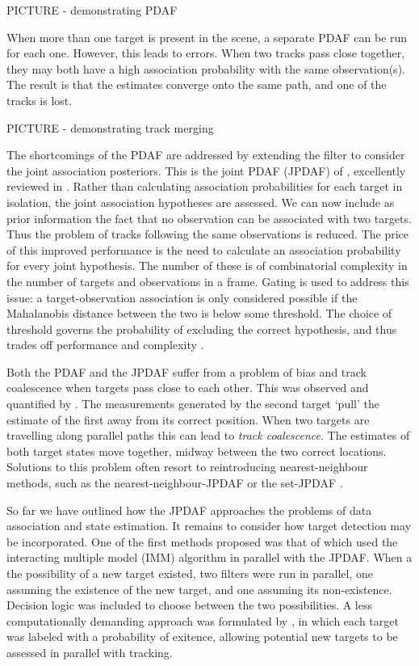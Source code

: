 PICTURE - demonstrating PDAF

When more than one target is present in the scene, a separate PDAF can be run for each one. However, this leads to errors. When two tracks pass close together, they may both have a high association probability with the same observation(s). The result is that the estimates converge onto the same path, and one of the tracks is lost.

PICTURE - demonstrating track merging

The shortcomings of the PDAF are addressed by extending the filter to consider the joint association posteriors. This is the joint PDAF (JPDAF) of \cite{Fortmann1983}, excellently reviewed in \cite{Bar-Shalom2009}. Rather than calculating association probabilities for each target in isolation, the joint association hypotheses are assessed. We can now include as prior information the fact that no observation can be associated with two targets. Thus the problem of tracks following the same observations is reduced. The price of this improved performance is the need to calculate an association probability for every joint hypothesis. The number of these is of combinatorial complexity in the number of targets and observations in a frame. Gating is used to address this issue: a target-observation association is only considered possible if the Mahalanobis distance between the two is below some threshold. The choice of threshold governs the probability of excluding the correct hypothesis, and thus trades off performance and complexity \cite{Sea1971}.

Both the PDAF and the JPDAF suffer from a problem of bias and track coalescence when targets pass close to each other. This was observed and quantified by \cite{Fitzgerald1985}. The measurements generated by the second target `pull' the estimate of the first away from its correct position. When two targets are travelling along parallel paths this can lead to \emph{track coalescence}. The estimates of both target states move together, midway between the two correct locations. Solutions to this problem often resort to reintroducing nearest-neighbour methods, such as the nearest-neighbour-JPDAF \cite{Fitzgerald1986} or the set-JPDAF \cite{Svensson2009a}.

So far we have outlined how the JPDAF approaches the problems of data association and state estimation. It remains to consider how target detection may be incorporated. One of the first methods proposed was that of \cite{Bar-Shalom1989} which used the interacting multiple model (IMM) algorithm in parallel with the JPDAF. When a the possibility of a new target existed, two filters were run in parallel, one assuming the existence of the new target, and one assuming its non-existence. Decision logic was included to choose between the two possibilities. A less computationally demanding approach was formulated by \cite{Musicki1994,Musicki2004}, in which each target was labeled with a probability of exitence, allowing potential new targets to be assessed in parallel with tracking.

